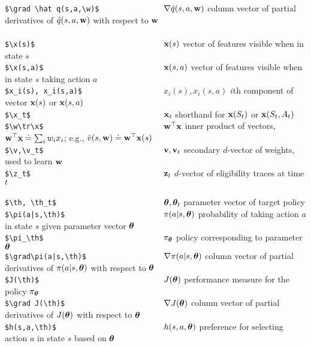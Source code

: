 \documentclass[10pt,fleqn]{article}
\begin{document}
\begin{tabbing}
\>\verb#$\grad \hat q(s,a,\w)$               #\>$\nabla \hat q(s,a,{\bf w})$\> column vector of partial derivatives of $\hat q(s,a,{\bf w})$ with respect to ${\bf w}$\\
\\
\>\verb+$\x(s)$                              +\>${\bf x}(s)$             \> vector of features visible when in state $s$\\
\>\verb+$\x(s,a)$                            +\>${\bf x}(s,a)$           \> vector of features visible when in state $s$ taking action $a$\\
\>\verb#$x_i(s), x_i(s,a)$                   #\>$x_i(s), x_i(s,a)$   \> $i$th component of vector ${\bf x}(s)$ or ${\bf x}(s, a)$\\
\>\verb+$\x_t$                               +\>${\bf x}_t$              \> shorthand for ${\bf x}(S_t)$ or ${\bf x}(S_t,A_t)$\\
\>\verb+$\w\tr\x$                            +\>${\bf w}^\top{\bf x}$           \> inner product of vectors, ${\bf w}^\top{\bf x}\doteq\sum_i w_i x_i$; e.g., $\hat v(s,{\bf w})\doteq{\bf w}^\top{\bf x}(s)$\\
\>\verb+$\v,\v_t$                            +\>${\bf v},{\bf v}_t$           \> secondary $d$-vector of weights, used to learn ${\bf w}$ \\
\>\verb+$\z_t$                               +\>${\bf z}_t$              \> $d$-vector of eligibility traces at time $t$ \\
\\
\>\verb+$\th, \th_t$                         +\>${\bm\theta}, {\bm\theta}_t$        \> parameter vector of target policy \\
\>\verb+$\pi(a|s,\th)$                       +\>$\pi(a|s,{\bm\theta})$      \> probability of taking action $a$ in state $s$ given parameter vector ${\bm\theta}$\\
\>\verb+$\pi_\th$                            +\>$\pi_{\bm\theta}$           \> policy corresponding to parameter ${\bm\theta}$\\
\>\verb#$\grad\pi(a|s,\th)$                  #\>$\nabla\pi(a|s,{\bm\theta})$ \>column vector of partial derivatives of $\pi(a|s,{\bm\theta})$ with respect to ${\bm\theta}$\\
\>\verb+$J(\th)$                             +\>$J({\bm\theta})$            \> performance measure for the policy $\pi_{\bm\theta}$\\
\>\verb+$\grad J(\th)$                       +\>$\nabla J({\bm\theta})$      \> column vector of partial derivatives of $J({\bm\theta})$ with respect to ${\bm\theta}$\\
\>\verb+$h(s,a,\th)$                         +\>$h(s,a,{\bm\theta})$        \> preference for selecting action $a$ in state $s$ based on ${\bm\theta}$\\

\end{tabbing}
\end{document}
